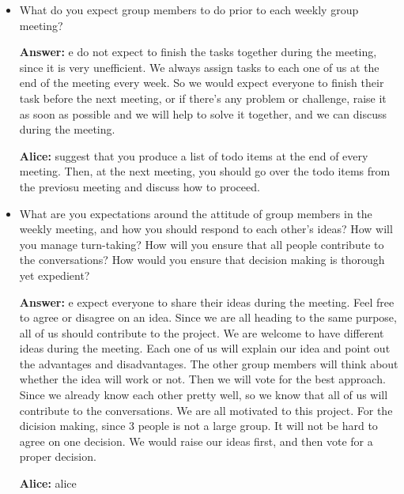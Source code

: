 \documentclass[12pt]{article}
\newenvironment{answer}[1]{
\color{blue}
	{\bf Answer:}
}{
}
\newenvironment{alice}[1]{
\color{magenta}
	{\bf Alice:}
}{
}
\begin{document}
\begin{itemize}
\item What do you expect group members to do prior to each weekly group meeting? 

\begin{answer}

We do not expect to finish the tasks together during the meeting, since it is very unefficient. We always assign tasks to each one of us at the end of the meeting every week. So we would expect everyone 
to finish their task before the next meeting, or if there's any problem or challenge, raise it as soon as possible and we will help to solve it together, and we can discuss during the meeting.
\end{answer}

\begin{alice}

I suggest that you produce a list of todo items at the end of every meeting.  Then, at the next meeting, you should go over the todo items from the previosu meeting and discuss how to proceed. 

\end{alice}


\item What are you expectations around the attitude of group members in the weekly meeting, and how you should respond to each other’s ideas?  How will you manage turn-taking? How will you ensure that all people contribute to the conversations? How would you ensure that decision making is thorough yet expedient?

\begin{answer}

We expect everyone to share their ideas during the meeting. Feel free to agree or disagree on an idea. Since we are all heading to the same purpose, all of us should contribute to the project. 
We are welcome to have different ideas during the meeting. Each one of us will explain our idea and point out the advantages and disadvantages. The other group members will think about whether the idea will work or not.
Then we will vote for the best approach. Since we already know each other pretty well, so we know that all of us will contribute to the conversations. We are all motivated to this project.
For the dicision making, since 3 people is not a large group. It will not be hard to agree on one decision. We would raise our ideas first, and then vote for a proper decision.
\end{answer}

\begin{alice}


\end{alice}
\end{itemize}
\end{document}
